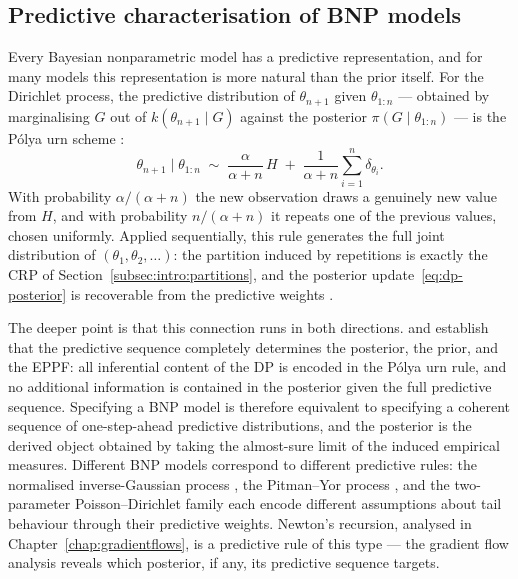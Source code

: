 \subsection{Predictive characterisation of BNP models}
\label{subsec:intro:predictive-bnp}

Every Bayesian nonparametric model has a predictive representation, and for
many models this representation is more natural than the prior itself.  For
the Dirichlet process, the predictive distribution of $\theta_{n+1}$ given
$\theta_{1:n}$ --- obtained by marginalising $G$ out of $k(\theta_{n+1}
\mid G)$ against the posterior $\pi(G \mid \theta_{1:n})$ --- is the
P\'{o}lya urn scheme \citep{BlackwellMacQueen1973}:
\begin{equation}
  \theta_{n+1} \mid \theta_{1:n}
  \;\sim\;
  \frac{\alpha}{\alpha + n}\, H
  \;+\;
  \frac{1}{\alpha + n} \sum_{i=1}^{n} \delta_{\theta_i}.
  \label{eq:polya-urn}
\end{equation}
With probability $\alpha/(\alpha + n)$ the new observation draws a
genuinely new value from $H$, and with probability $n/(\alpha + n)$ it
repeats one of the previous values, chosen uniformly.  Applied
sequentially, this rule generates the full joint distribution of
$(\theta_1, \theta_2, \ldots)$: the partition induced by repetitions is
exactly the CRP of Section~\ref{subsec:intro:partitions}, and the posterior
update~\eqref{eq:dp-posterior} is recoverable from the predictive
weights \citep{BlackwellMacQueen1973}.

The deeper point is that this connection runs in both directions.
\citet{FortiniPetrone2012} and \citet{FongHolmesWalker2023} establish that
the predictive sequence completely determines the posterior, the prior, and
the EPPF: all inferential content of the DP is encoded in the P\'{o}lya
urn rule, and no additional information is contained in the posterior given
the full predictive sequence.  Specifying a BNP model is therefore
equivalent to specifying a coherent sequence of one-step-ahead predictive
distributions, and the posterior is the derived object obtained by taking
the almost-sure limit of the induced empirical measures.  Different BNP
models correspond to different predictive rules: the normalised
inverse-Gaussian process \citep{LijoiMenaPrunster2005}, the Pitman--Yor
process \citep{PitmanYor1997}, and the two-parameter Poisson--Dirichlet
family \citep{Pitman2006} each encode different assumptions about tail
behaviour through their predictive weights.  Newton's recursion, analysed
in Chapter~\ref{chap:gradientflows}, is a predictive rule of this type ---
the gradient flow analysis reveals which posterior, if any, its predictive
sequence targets.

